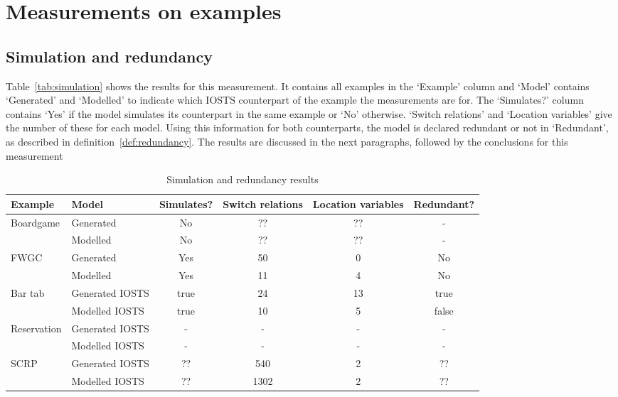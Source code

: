 \section{Measurements on examples}

\subsection{Simulation and redundancy}
Table~\ref{tab:simulation} shows the results for this measurement. It contains all examples in the `Example' column and `Model' contains `Generated' and `Modelled' to indicate which IOSTS counterpart of the example the measurements are for. The `Simulates?' column contains `Yes' if the model simulates its counterpart in the same example or `No' otherwise. `Switch relations' and `Location variables' give the number of these for each model. Using this information for both counterparts, the model is declared redundant or not in `Redundant', as described in definition~\ref{def:redundancy}. The results are discussed in the next paragraphs, followed by the conclusions for this measurement

\begin{table}[ht]
\begin{center}
\begin{tabular}{|l|l|c|c|c|c|}
\hline
\textbf{Example} & \textbf{Model} & \textbf{Simulates?} & \textbf{Switch relations} & \textbf{Location variables} & \textbf{Redundant?} \\ \hline
Boardgame & Generated & No & ?? & ?? & - \\ \cline{2-6}
 & Modelled & No & ?? & ?? & - \\ \hline
FWGC & Generated & Yes & 50 & 0 & No \\ \cline{2-6}
 & Modelled & Yes & 11 & 4 & No \\ \hline
Bar tab & Generated IOSTS & true & 24 & 13 & true \\ \cline{2-6}
 & Modelled IOSTS & true & 10 & 5 & false \\ \hline
Reservation & Generated IOSTS & - & - & - & - \\ \cline{2-6}
 & Modelled IOSTS & - & - & - & - \\ \hline
SCRP & Generated IOSTS & ?? & 540 & 2 & ?? \\ \cline{2-6}
 & Modelled IOSTS & ?? & 1302 & 2 & ?? \\ \hline
\end{tabular}
\end{center}
\caption{Simulation and redundancy results}
\label{tab:fwgc-simulate}
\end{table}

